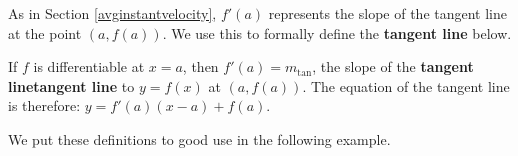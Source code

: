 \documentclass{ximera}
\begin{document}
As in Section \ref{avginstantvelocity},  $f'(a)$ represents the slope of the tangent line at the point $(a, f(a))$.  We use this to formally define the \textbf{tangent line} below.


\begin{definition} \label{tangentlinedefn}  If $f$ is differentiable at $x = a$, then $f'(a) =  m_{\text{tan}}$, the slope of the \textbf{tangent line}\textbf{tangent line} to $y = f(x)$ at $(a, f(a))$.   The equation of the tangent line is therefore:  $y = f'(a)(x-a) + f(a)$.  



\end{definition}




We put these definitions to good use in the following example.
\end{document}
